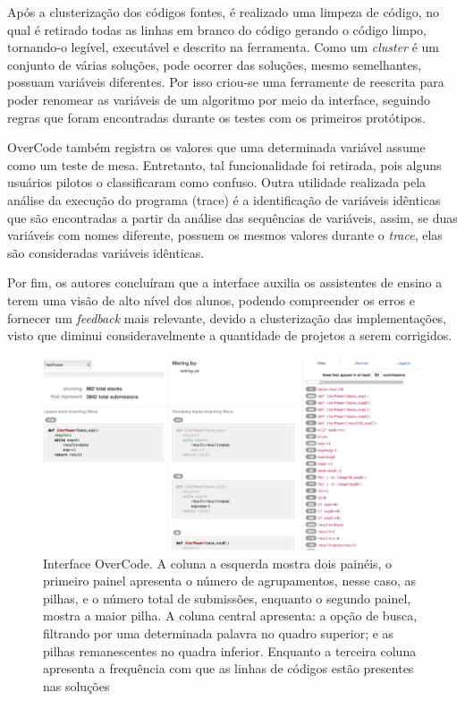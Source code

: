     Após a clusterização dos códigos fontes, é realizado uma limpeza de código,
    no qual é retirado todas as linhas em branco do código gerando o código limpo,
    tornando-o legível, executável e descrito na ferramenta. Como um \textit{cluster}
    é um conjunto de várias soluções, pode ocorrer das soluções, mesmo semelhantes,
    possuam variáveis diferentes. Por isso criou-se uma ferramente de reescrita
    para poder renomear as variáveis de um algoritmo por meio da interface,
    seguindo regras que foram encontradas durante os testes com os primeiros protótipos.
    
    OverCode também registra os valores que uma determinada variável assume como
    um teste de mesa. Entretanto, tal funcionalidade foi retirada, pois alguns
    usuários pilotos o classificaram como confuso. Outra utilidade realizada pela
    análise da execução do programa (trace) é a identificação de variáveis idênticas
    que são encontradas a partir da análise das sequências de variáveis, assim, se
    duas variáveis com nomes diferente, possuem os mesmos valores durante o
    \textit{trace}, elas são consideradas variáveis idênticas.
    
    Por fim, os autores concluíram que a interface auxilia os assistentes de
    ensino a terem uma visão de alto nível dos alunos, podendo compreender os
    erros e fornecer um \textit{feedback} mais relevante, devido a clusterização
    das implementações, visto que diminui consideravelmente a quantidade de
    projetos a serem corrigidos.
    
    \begin{figure}[ht]
        \centering
        \includegraphics[scale=0.4]{imagem/overCode.png}
        \caption{Interface OverCode. A coluna a esquerda mostra dois painéis, o
        	primeiro painel apresenta o número de agrupamentos, nesse caso, as
        	pilhas, e o número total de submissões, enquanto o segundo painel,
        	mostra a maior pilha. A coluna central apresenta: a opção de busca,
        	filtrando por uma determinada palavra no quadro superior; e as pilhas
        	remanescentes no quadra inferior. Enquanto a terceira coluna apresenta
        	a frequência com que as linhas de códigos estão presentes nas soluções}
        \label{fig:interfaceOverCode}
    \end{figure}
    

